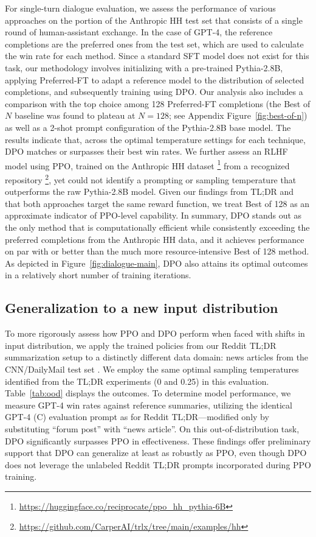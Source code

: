 For single-turn dialogue evaluation, we assess the performance of various approaches on the portion of the Anthropic HH test set \citep{bai2022training} that consists of a single round of human-assistant exchange. In the case of GPT-4, the reference completions are the preferred ones from the test set, which are used to calculate the win rate for each method. Since a standard SFT model does not exist for this task, our methodology involves initializing with a pre-trained Pythia-2.8B, applying Preferred-FT to adapt a reference model to the distribution of selected completions, and subsequently training using DPO. Our analysis also includes a comparison with the top choice among 128 Preferred-FT completions (the Best of $N$ baseline was found to plateau at $N=128$; see Appendix Figure~\ref{fig:best-of-n}) as well as a 2-shot prompt configuration of the Pythia-2.8B base model. The results indicate that, across the optimal temperature settings for each technique, DPO matches or surpasses their best win rates. We further assess an RLHF model using PPO, trained on the Anthropic HH dataset \footnote{\url{https://huggingface.co/reciprocate/ppo_hh_pythia-6B}} from a recognized repository \footnote{\url{https://github.com/CarperAI/trlx/tree/main/examples/hh}}, yet could not identify a prompting or sampling temperature that outperforms the raw Pythia-2.8B model. Given our findings from TL;DR and that both approaches target the same reward function, we treat Best of 128 as an approximate indicator of PPO-level capability. In summary, DPO stands out as the only method that is computationally efficient while consistently exceeding the preferred completions from the Anthropic HH data, and it achieves performance on par with or better than the much more resource-intensive Best of 128 method. As depicted in Figure~\ref{fig:dialogue-main}, DPO also attains its optimal outcomes in a relatively short number of training iterations.

\subsection{Generalization to a new input distribution}

To more rigorously assess how PPO and DPO perform when faced with shifts in input distribution, we apply the trained policies from our Reddit TL;DR summarization setup to a distinctly different data domain: news articles from the CNN/DailyMail test set \citep{nallapati-etal-2016-abstractive}. We employ the same optimal sampling temperatures identified from the TL;DR experiments (0 and 0.25) in this evaluation. Table~\ref{tab:ood} displays the outcomes. To determine model performance, we measure GPT-4 win rates against reference summaries, utilizing the identical GPT-4 (C) evaluation prompt as for Reddit TL;DR—modified only by substituting ``forum post'' with ``news article''. On this out-of-distribution task, DPO significantly surpasses PPO in effectiveness. These findings offer preliminary support that DPO can generalize at least as robustly as PPO, even though DPO does not leverage the unlabeled Reddit TL;DR prompts incorporated during PPO training.

